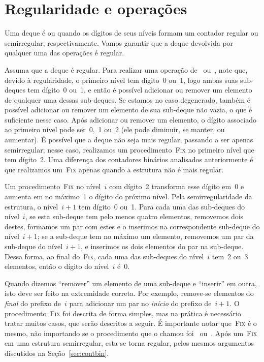 \documentclass[main.tex]{subfiles}
\begin{document}
\section{Regularidade e operações} \label{sec:reg_op}

Uma deque é  ou  quando os dígitos de seus níveis formam um contador regular ou semirregular, respectivamente. Vamos garantir que a deque devolvida por qualquer uma das operações é regular.

Assuma que a deque é regular. Para realizar uma operação de~ ou~, note que, devido à regularidade, o primeiro nível tem dígito~0 ou~1, logo ambas suas sub-deques tem dígito~0 ou~1, e então é possível adicionar ou remover um elemento de qualquer uma dessas sub-deques. Se estamos no caso degenerado, também é possível adicionar ou remover um elemento de sua sub-deque não vazia, o que é suficiente nesse caso.
Após adicionar ou remover um elemento, o dígito associado ao primeiro nível pode ser~0,~1 ou~2 (ele pode diminuir, se manter, ou aumentar). É possível que a deque não seja mais regular, passando a ser apenas semirregular; nesse caso, realizamos um procedimento~\textsc{Fix} no primeiro nível que tem dígito~2. Uma diferença dos contadores binários analisados anteriormente é que realizamos um~\textsc{Fix} apenas quando a estrutura não é mais regular.

Um procedimento~\textsc{Fix} no nível~$i$ com dígito~2 transforma esse dígito em~0 e aumenta em no máximo~1 o dígito do próximo nível. Pela semirregularidade da estrutura, o nível~$i+1$ tem dígito~0 ou~1. Para cada uma das sub-deques do nível~$i$, se esta sub-deque tem pelo menos quatro elementos, removemos dois destes, formamos um par com estes e o inserimos na correspondente sub-deque do nível~$i+1$; se a sub-deque tem no máximo um elemento, removemos um par da sub-deque do nível~$i+1$, e inserimos os dois elementos do par na sub-deque. Dessa forma, ao final do~\textsc{Fix}, cada uma das sub-deques do nível~$i$ tem~2 ou~3 elementos, então o dígito do nível~$i$ é~0.

Quando dizemos ``remover'' um elemento de uma sub-deque e ``inserir'' em outra, isto deve ser feito na extremidade correta. Por exemplo, remove-se elementos do \emph{final} do prefixo de~$i$ para adicionar um par no \emph{início} do prefixo de~$i+1$. O procedimento~\textsc{Fix} foi descrita de forma simples, mas na prática é necessário tratar muitos casos, que serão descritos a seguir. É importante notar que~\textsc{Fix} é o mesmo, não importando se o procedimento que o chamou foi~ ou~. Após um~\textsc{Fix} em uma estrutura semirregular, esta se torna regular, pelos mesmos argumentos discutidos na Seção~\ref{sec:contbin}.
\end{document}
